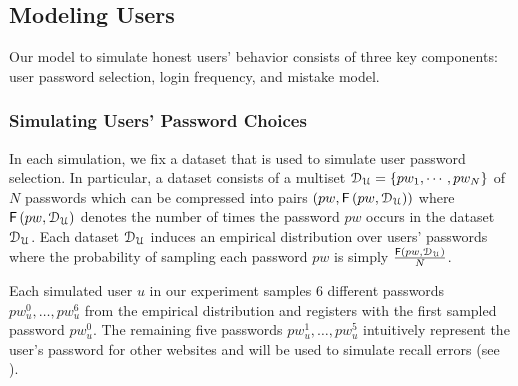 
\vspace*{-\baselineskip}
\subsection{Modeling Users} \label{section:ExperimentDesign-subsection:SimulateUser}
\vspace*{-\baselineskip}
Our model to simulate honest users' behavior consists of three key components: user password selection, login frequency, and mistake model. 
\vspace*{-\baselineskip}
\vspace*{-\baselineskip}
\subsubsection{Simulating Users’ Password Choices}\label{section:ExperimentDesign-subsection:SimulateUser-subsubsection:SimulatePasswordChoice}
\vspace*{-\baselineskip}
In each simulation, we fix a dataset that is used to simulate user password selection. In particular, a dataset consists of a multiset $\mathcal{D}_{{\mathcal{U}}} = \{pw_1,\cdots,pw_N\}$ of $N$ passwords which can be compressed into pairs $(pw,  \mathsf{F}\left(pw, \mathcal{D}_{{\mathcal{U}}} \right))$ where $\mathsf{F}\left(pw, \mathcal{D}_{{\mathcal{U}}} \right)$ denotes the number of times the password $pw$ occurs in the dataset $\mathcal{D}_{{\mathcal{U}}}$. Each dataset $\mathcal{D}_{{\mathcal{U}}} $ induces an empirical distribution over users’ passwords where the probability of sampling each password $pw$ is simply $\frac{\mathsf{F}\left(pw, \mathcal{D}_{{\mathcal{U}}}\right)}{N}$. 

 Each simulated user $u$ in our experiment samples 6 different passwords $pw_{u}^0,\ldots, pw_u^6$ {from} the empirical distribution and registers with the first sampled password $pw_u^{0}$. The remaining five passwords $pw_{u}^1,\ldots, pw_u^5$  intuitively represent the user's password for other websites and will be used to simulate recall errors (see ).  





